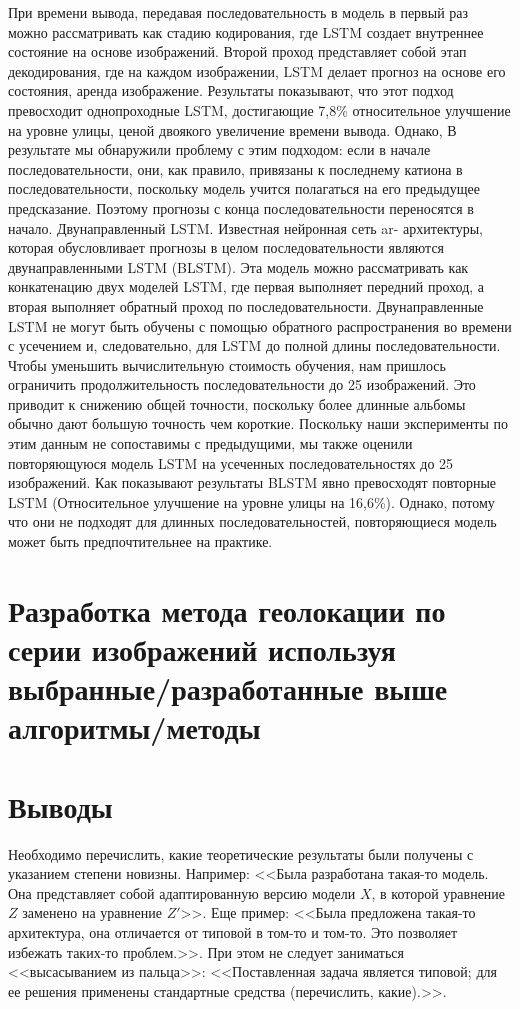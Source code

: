 При времени вывода, передавая последовательность в модель
в первый раз можно рассматривать как стадию кодирования, где
LSTM создает внутреннее состояние на основе изображений.
Второй проход представляет собой этап декодирования, где на каждом изображении,
LSTM делает прогноз на основе его состояния,
аренда изображение. Результаты показывают, что этот подход превосходит
однопроходные LSTM, достигающие 7,8\%
относительное улучшение на уровне улицы, ценой двоякого
увеличение времени вывода. Однако,
В результате мы обнаружили проблему с этим подходом:
если в начале
последовательности, они, как правило, привязаны к последнему
катиона в последовательности, поскольку модель учится полагаться на
его предыдущее предсказание. Поэтому прогнозы с конца
последовательности переносятся в начало.
Двунаправленный LSTM. Известная нейронная сеть ar-
архитектуры, которая обусловливает прогнозы в целом
последовательности являются двунаправленными LSTM (BLSTM). Эта модель можно рассматривать как конкатенацию двух моделей LSTM, где первая выполняет передний проход, а вторая выполняет обратный проход по последовательности. Двунаправленные LSTM не могут быть обучены с помощью обратного распространения во времени с усечением и, следовательно, для LSTM до полной длины последовательности. Чтобы уменьшить
вычислительную стоимость обучения, нам пришлось ограничить продолжительность
последовательности до 25 изображений. Это приводит к снижению общей
точности, поскольку более длинные альбомы обычно дают
большую точность чем короткие. Поскольку наши эксперименты по этим данным
не сопоставимы с предыдущими, мы также
оценили повторяющуюся модель LSTM на усеченных последовательностях
до 25 изображений. Как показывают результаты BLSTM явно превосходят повторные LSTM
(Относительное улучшение на уровне улицы на 16,6\%). Однако,
потому что они не подходят для длинных последовательностей, повторяющиеся модель может быть предпочтительнее на практике.


\section{Разработка метода геолокации по серии изображений используя выбранные/разработанные выше алгоритмы/методы}

\section{Выводы}

Необходимо перечислить, какие теоретические результаты были получены с 
указанием степени новизны. Например: <<Была разработана такая-то модель. Она 
представляет собой адаптированную версию модели $X$, в которой уравнение $Z$ 
заменено на уравнение $Z'$>>. Еще пример: <<Была предложена такая-то 
архитектура, она отличается от типовой в том-то и том-то. Это позволяет 
избежать таких-то проблем.>>. При этом не следует заниматься <<высасыванием из 
пальца>>: <<Поставленная задача является типовой; для ее решения применены 
стандартные средства (перечислить, какие).>>.
